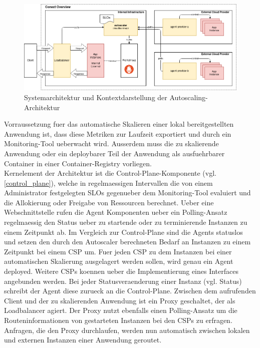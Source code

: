 \documentclass[runningheads]{llncs}
\begin{document}
\begin{figure}
	\centering
	\includegraphics[width=1.0\linewidth,scale=1.0]{images/context.png}
	\caption{Systemarchitektur und Kontextdarstellung der Autoscaling-Architektur}
	\label{systemarchitektur}
\end{figure}

Vorraussetzung fuer das automatische Skalieren einer lokal bereitgestellten Anwendung ist, dass diese Metriken zur Laufzeit exportiert und durch ein Monitoring-Tool ueberwacht wird. Ausserdem muss die zu skalierende Anwendung oder ein deploybarer Teil der Anwendung als ausfuehrbarer Container in einer Container-Registry vorliegen. \\

Kernelement der Architektur ist die Control-Plane-Komponente (vgl. \ref{control_plane}), welche in regelmaessigen Intervallen die von einem Administrator festgelegten SLOs gegenueber dem Monitoring-Tool evaluiert und die Allokierung oder Freigabe von Ressourcen berechnet. Ueber eine Webschnittstelle rufen die Agent Komponenten ueber ein Polling-Ansatz regelmaessig den Status ueber zu startende oder zu terminierende Instanzen zu einem Zeitpunkt ab. Im Vergleich zur Control-Plane sind die Agents statuslos und setzen den durch den Autoscaler berechneten Bedarf an Instanzen zu einem Zeitpunkt bei einem CSP um. Fuer jeden CSP zu dem Instanzen bei einer automatischen Skalierung ausgelagert werden sollen, wird genau ein Agent deployed. Weitere CSPs koennen ueber die Implementierung eines Interfaces angebunden werden. Bei jeder Statusveraenderung einer Instanz (vgl. Status) schreibt der Agent diese zurueck an die Control-Plane. Zwischen dem aufrufenden Client und der zu skalierenden Anwendung ist ein Proxy geschaltet, der als Loadbalancer agiert. Der Proxy nutzt ebenfalls einen Polling-Ansatz um die Routeninformationen von gestarteten Instanzen bei den CSPs zu erfragen. Anfragen, die den Proxy durchlaufen, werden nun automatisch zwischen lokalen und externen Instanzen einer Anwendung geroutet.
\end{document}
